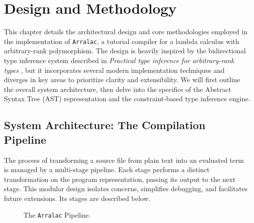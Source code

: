 \chapter{Design and Methodology}
\label{chap:DesignAndMethodology}

This chapter details the architectural design and core methodologies employed in the implementation of \texttt{Arralac}, a tutorial compiler for a lambda calculus with arbitrary-rank polymorphism. The design is heavily inspired by the bidirectional type inference system described in \textit{Practical type inference for arbitrary-rank types} \cite{jones-practical-2007}, but it incorporates several modern implementation techniques and diverges in key areas to prioritize clarity and extensibility. We will first outline the overall system architecture, then delve into the specifics of the Abstract Syntax Tree (AST) representation and the constraint-based type inference engine.

\section{System Architecture: The Compilation Pipeline}
\label{sec:Design:Pipeline}

The process of transforming a source file from plain text into an evaluated term is managed by a multi-stage pipeline. Each stage performs a distinct transformation on the program representation, passing its output to the next stage. This modular design isolates concerns, simplifies debugging, and facilitates future extensions. Its stages are described below.

\begin{figure}[h!]
    \centering
    \caption{The \texttt{Arralac} Pipeline.}
    \label{fig:pipeline}
\end{figure}



